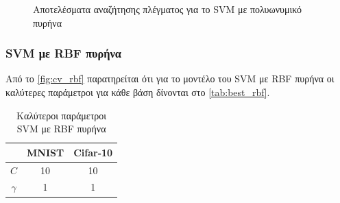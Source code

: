 \documentclass[a4paper]{article}
\begin{document}
\begin{figure}[H]
    \caption{Αποτελέσματα αναζήτησης πλέγματος για το SVM με πολυωνυμικό
    πυρήνα}
    \label{fig:cv_poly}
\end{figure}


\subsubsection{SVM με RBF πυρήνα}

Από το \autoref{fig:cv_rbf} παρατηρείται ότι για το μοντέλο του SVM με RBF
πυρήνα οι καλύτερες παράμετροι για κάθε βάση δίνονται στο
\autoref{tab:best_rbf}.

\begin{table}[h]
\centering
\begin{tabular}{|c|c|c|}
\hline
         & MNIST & Cifar-10 \\ \hline
$C$      & 10    & 10       \\ \hline
$\gamma$ & 1     & 1        \\ \hline
\end{tabular}
\caption{Καλύτεροι παράμετροι SVM με RBF πυρήνα}
\label{tab:best_rbf}
\end{table}
\end{document}
